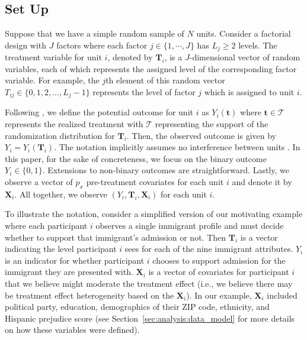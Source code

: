 \documentclass[11pt]{article}
\newcommand\cT{\mathcal{T}}
\newcommand\bT{\bm{T}}
\newcommand\bt{\bm{t}}
\newcommand\bX{\bm{X}}
\begin{document}
\subsection{Set Up}

Suppose that we have a simple random sample of $N$ units.  Consider a
factorial design with $J$ factors where each factor
$j \in \{1, \cdots, J\}$ has $L_j \ge 2$ levels.  The treatment
variable for unit $i$, denoted by $\bT_i$, is a $J$-dimensional vector
of random variables, each of which represents the assigned level of
the corresponding factor variable.  For example, the $j$th element of
this random vector $T_{ij} \in \{0,1,2,\ldots,L_j-1\}$ represents the
level of factor $j$ which is assigned to unit $i$.

Following \cite{DasPilRub15}, we define the potential outcome for unit $i$ as
$Y_i(\bt)$ where $\bt \in \cT$ represents the realized treatment with
$\cT$ representing the support of the randomization distribution for
$\bT_i$.  Then, the observed outcome is given by $Y_i = Y_i(\bT_i)$.
The notation implicitly assumes no interference between units
\citep{Rubin80}.  In this paper, for the sake of concreteness, we
focus on the binary outcome $Y_i \in \{0, 1\}$.  Extensions to
non-binary outcomes are straightforward.  Lastly, we observe a vector
of $p_x$ pre-treatment covariates for each unit $i$ and denote it by
$\bX_i$.
All together, we observe $(Y_i, \bT_i, \bX_i)$ for each unit $i$.

To illustrate the notation, consider a simplified version of our motivating example where each participant $i$ observes a single immigrant profile and must decide whether to support that immigrant's admission or not.
Then $\bT_i$ is a vector indicating the level participant $i$ sees for each of the nine immigrant attributes.
$Y_i$ is an indicator for whether participant $i$ chooses to support admission for the immigrant they are presented with.
$\bX_i$ is a vector of covariates for participant $i$ that we believe might moderate the treatment effect (i.e., we believe there may be treatment effect heterogeneity based on the $\bX_i$).
In our example, $\bX_i$ included political party, education, demographics of their ZIP code, ethnicity, and Hispanic prejudice score (see Section~\ref{sec:analysis:data_model} for more details on how these variables were defined).
\end{document}
